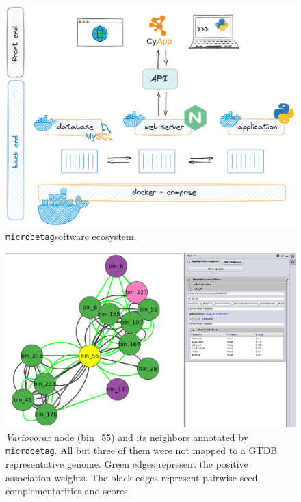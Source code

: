 \documentclass[sn-mathphys,Numbered]{sn-jnl}  %
\theoremstyle{thmstyleone}%
\theoremstyle{thmstyletwo}%
\theoremstyle{thmstylethree}%
\newcommand{\microbetag}{\texttt{microbetag}}
\begin{document}
\begin{appendices}
        \begin{figure}[H]
            \includegraphics*[width=0.9\columnwidth]{figs/architecture.png}
            \caption{
                \microbetag software ecosystem.
            }
        \label{fig:s1}
        \end{figure}
    
        \begin{figure}[H]
            \includegraphics*[width=0.9\columnwidth]{figs/node55Neigh.png}
            \caption{
                \textit{Variovorax} node (bin\_55) and its neighbors annotated by \microbetag. 
                All but three of them were not mapped to a GTDB representative genome. 
                Green edges represent the positive association weights. 
                The black edges represent pairwise seed complementarities and scores.
            }
            \label{fig:s2}
        \end{figure}
        


\end{appendices}
\end{document}
